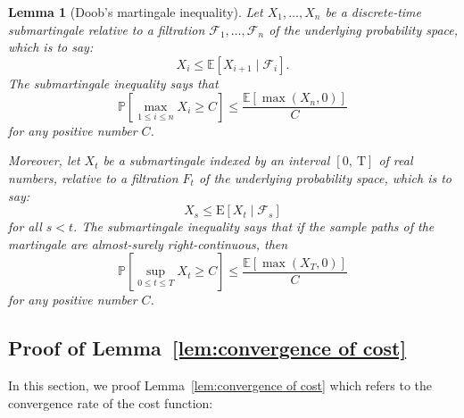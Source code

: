 \documentclass{article}
\newtheorem{lemma}[theorem]{Lemma}
\theoremstyle{definition}
\begin{document}
\begin{lemma}[Doob's martingale inequality]\label{lem:doob}
	Let $X_1, \ldots, X_n$ be a discrete-time submartingale relative to a filtration $\mathcal{F}_1, \ldots, \mathcal{F}_n$ of the underlying probability space, which is to say:
	$$
	X_i \leq \mathbb{E}\left[X_{i+1} \mid \mathcal{F}_i\right] .
	$$
	The submartingale inequality says that
	$$
	\mathbb{P}\left[\max _{1 \leq i \leq n} X_i \geq C\right] \leq \frac{\mathbb{E}\left[\max \left(X_n, 0\right)\right]}{C}
	$$
	for any positive number $C$. 
	
	Moreover, let $X_t$ be a submartingale indexed by an interval $[0, \mathrm{~T}]$ of real numbers, relative to a filtration $F_t$ of the underlying probability space, which is to say:
	$$
	X_s \leq \mathrm{E}\left[X_t \mid \mathcal{F}_s\right]
	$$
	for all $s<t$. The submartingale inequality says that if the sample paths of the martingale are almost-surely right-continuous, then
	$$
	\mathbb{P}\left[\sup _{0 \leq t \leq T} X_t \geq C\right] \leq \frac{\mathbb{E}\left[\max \left(X_T, 0\right)\right]}{C}
	$$
	for any positive number $C$. 
\end{lemma}

\subsection{Proof of Lemma~\ref{lem:convergence of cost}}
In this section, we proof Lemma~\ref{lem:convergence of cost} which refers to the convergence rate of the cost function:
\end{document}
